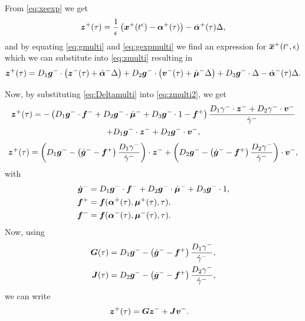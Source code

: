 \documentclass[../DC2017114Bouma.tex]{subfiles}
\begin{document}
From \eqref{eq:xeexp} we get
\begin{align}
{\boldsymbol{z}}^+(\tau) = \frac{1}{\epsilon}\left({\boldsymbol{x}}^{+}(t^\epsilon) - \boldsymbol{\alpha}^+(\tau)\right) -\dot{\boldsymbol{\alpha}}^+(\tau)\Delta,\label{eq:zmulti}
\end{align}
and by equating \eqref{eq:gmulti} and \eqref{eq:gexpmulti} we find an expression for $\overline{{\boldsymbol{x}}}^{+}(t^\epsilon,\epsilon)$ which we can substitute into \eqref{eq:zmulti} resulting in
\begin{align}
{\boldsymbol{z}}^+(\tau) = D_1{\boldsymbol{g}}^-\cdot\left({\boldsymbol{z}}^- (\tau) + \dot{\boldsymbol{\alpha}}^-\Delta \right) + D_2{\boldsymbol{g}}^-\cdot \left({\boldsymbol{v}}^- (\tau) + \dot{\boldsymbol{\mu}}^-\Delta \right) + D_3{\boldsymbol{g}}^-\cdot\Delta -\dot{\boldsymbol{\alpha}}^-(\tau)\Delta. \label{eq:zmulti2}
\end{align}

Now, by substituting \eqref{eq:Deltamulti} into \eqref{eq:zmulti2}, we get
\begin{multline}
{\boldsymbol{z}}^+(\tau) = - \left(D_1{\boldsymbol{g}}^-\cdot {\boldsymbol{f}}^{-} + D_2{\boldsymbol{g}}^-\cdot \dot{\boldsymbol{\mu}}^- + D_3{\boldsymbol{g}}^-\cdot 1 - {\boldsymbol{f}}^+\right)\frac{D_1\gamma^-\cdot{\boldsymbol{z}}^- + D_2\gamma^-\cdot{\boldsymbol{v}}^-}{\dot{\gamma}^-}\\ + D_1{\boldsymbol{g}}^-\cdot{\boldsymbol{z}}^- + D_2{\boldsymbol{g}}^-\cdot{\boldsymbol{v}}^-,
\end{multline}
\begin{align}
{\boldsymbol{z}}^+(\tau) = \left(D_1{\boldsymbol{g}}^- - \left(\dot{{\boldsymbol{g}}}^- - {\boldsymbol{f}}^+\right)\frac{D_1\gamma^-}{\dot{\gamma}^-}\right)\cdot{\boldsymbol{z}}^- + \left(D_2{\boldsymbol{g}}^- - \left(\dot{{\boldsymbol{g}}}^- - {\boldsymbol{f}}^+\right)\frac{D_2\gamma^-}{\dot{\gamma}^-}\right)\cdot{\boldsymbol{v}}^-,\label{eq:zmulti3}
\end{align}
with
\begin{align}
\dot{{\boldsymbol{g}}}^- &= D_1{\boldsymbol{g}}^-\cdot {\boldsymbol{f}}^- + D_2{\boldsymbol{g}}^-\cdot \dot{\boldsymbol{\mu}}^- + D_3{\boldsymbol{g}}^-\cdot 1,\\
{\boldsymbol{f}}^+ &={\boldsymbol{f}}(\boldsymbol{\alpha}^+(\tau),\boldsymbol{\mu}^+(\tau),\tau),\\
{\boldsymbol{f}}^- &={\boldsymbol{f}}(\boldsymbol{\alpha}^-(\tau),\boldsymbol{\mu}^-(\tau),\tau).
\end{align}
Now, using
\begin{align}
{\boldsymbol{G}}(\tau) &= D_1{\boldsymbol{g}}^- - \left(\dot{{\boldsymbol{g}}}^- - {\boldsymbol{f}}^+\right)\frac{D_1\gamma^-}{\dot{\gamma}^-},\\
{\boldsymbol{J}}(\tau) &= D_2{\boldsymbol{g}}^- - \left(\dot{{\boldsymbol{g}}}^- - {\boldsymbol{f}}^+\right)\frac{D_2\gamma^-}{\dot{\gamma}^-},
\end{align}
we can write 
\begin{align}
{\boldsymbol{z}}^+(\tau) &= {\boldsymbol{G}}{\boldsymbol{z}}^- + {\boldsymbol{J}}{\boldsymbol{v}}^-.
\end{align}
\end{document}
